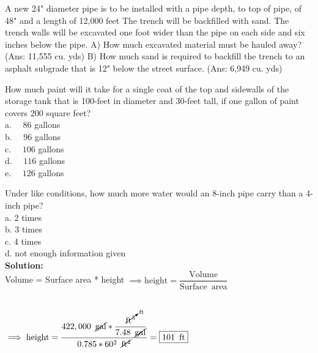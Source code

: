 A new 24" diameter pipe is to be installed with a pipe depth, to top of pipe, of 48" and a length of 12,000 feet
The trench will be backfilled with sand. The trench walls will be excavated one foot wider than the pipe on each side and six inches below the pipe.  A) How much excavated material must be hauled away?  (Ans: 11,555 cu. yds) B) How much sand is required to backfill the trench to an asphalt subgrade that is 12" below the street surface. (Ans: 6,949 cu. yds)

How much paint will it take for a single coat of the top and sidewalls of the storage tank that is 100-feet in diameter and 30-feet tall, if one gallon of paint covers 200 square feet?\\
a. $\quad 86$ gallons\\
b. $\quad 96$ gallons\\
c. $\quad 106$ gallons\\
d. $\quad 116$ gallons\\
e. $\quad 126$ gallons

Under like conditions, how much more water would an 8-inch pipe carry than a 4-inch pipe?\\
a.	2 times\\
b.	3 times\\
c.	4 times\\
d.	not enough information given\\





\textbf{Solution:}\\


Volume = Surface area * height $\implies \mathrm{height}=\dfrac{\mathrm{Volume}}{\mathrm{Surface \enspace area}}$\\
\vspace{0.2cm}

\\
\vspace{0.2cm}
$\implies \mathrm{height}=\dfrac{422,000 \enspace \cancel{\mathrm{gal}}*\dfrac{\cancelto{\mathrm{ft}}{\mathrm{ft}^3}}{7.48 \enspace \cancel{\mathrm{gal}}}}{0.785*60^2 \enspace \cancel{\mathrm{ft^2}}}=\boxed{101 \enspace \mathrm{ft}}$



